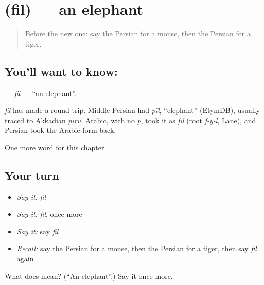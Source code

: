 \section[\texorpdfstring{\fa{فیل} (fil)}{فیل (fil)}]{ (fil) — an elephant}

\label{lesson:FA-C56-fil}



\begin{quote}
Before the new one: say the Persian for a mouse, then the Persian for a tiger.
\end{quote}

\subsection*{You'll want to know: }
\textbf{} — \emph{fil} — \textquotedblleft{}an elephant\textquotedblright{}.

\begin{cousinweb}
\emph{fil} has made a round trip. Middle Persian had \emph{pīl}, \textquotedblleft{}elephant\textquotedblright{} (EtymDB), usually traced to Akkadian \emph{pīru}. Arabic, with no \emph{p}, took it as \emph{fīl} (root \emph{f-y-l}, Lane), and Persian took the Arabic form back.
\end{cousinweb}

\begin{grammarlens}[title={What you've built}]
One more word for this chapter.
\end{grammarlens}

\subsection*{Your turn}
\begin{itemize}
\raggedright
  \item \emph{Say it:} \emph{fil}
  \item \emph{Say it:} \emph{fil}, once more
  \item \emph{Say it:} say \emph{fil}
  \item \emph{Recall:} say the Persian for a mouse, then the Persian for a tiger, then say \emph{fil} again
\end{itemize}

\begin{tcolorbox}[breakable,colback=teal!4,colframe=teal!35!black,title={Before you move on}]
What does  mean? (\textquotedblleft{}An elephant\textquotedblright{}.) Say it once more.
\end{tcolorbox}

